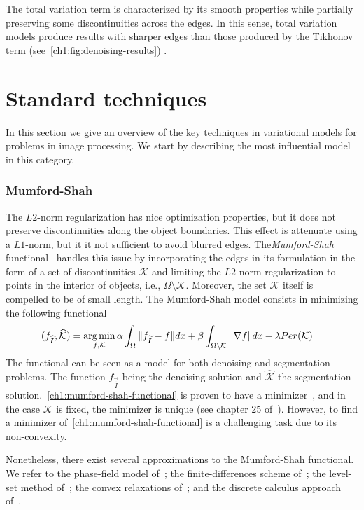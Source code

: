 The total variation term is characterized by its smooth properties while partially preserving some discontinuities across the edges. In this sense, total variation models produce results with sharper edges than those produced by the Tikhonov term (see~\cref{ch1:fig:denoising-results}) .

\section{Standard techniques}

In this section we give an overview of the key techniques in variational models for problems in image processing. We start by describing the most influential model in this category.

\subsubsection{Mumford-Shah}
The $L2$-norm regularization has nice optimization properties, but it does not preserve discontinuities along the object boundaries. This effect is attenuate using a $L1$-norm, but it it not sufficient to avoid blurred edges. The\emph{Mumford-Shah} functional~\cite{mumford89} handles this issue by incorporating the edges in its formulation in the form of a set of discontinuities $\mathcal{K}$ and limiting the $L2$-norm regularization to points in the interior of objects, i.e.,  $\Omega \setminus \mathcal{K}$. Moreover, the set $\mathcal{K}$ itself is compelled to be of small length. The Mumford-Shah model consists in minimizing the following functional 
\begin{align}
	(f_{\bm{\widehat{I}}},\mathcal{\widehat{K}}) &= \operatorname*{arg\,min}_{f,\mathcal{K}} \alpha \int_{\Omega}{ \lVert f_{\bm{\widetilde{I}}}-f\rVert dx} + \beta \int_{\Omega \setminus \mathcal{K}}{\lVert\nabla f\rVert dx} + \lambda Per(\mathcal{K})
	\label{ch1:mumford-shah-functional}
\end{align}
%
The functional can be seen as a model for both denoising and segmentation problems. The function $f_{\vec{\widehat{I}}}$ being the denoising solution and $\mathcal{\widehat{K}}$ the segmentation solution.~\cref{ch1:mumford-shah-functional} is proven to have a minimizer~\cite{degiorgi89}, and in the case $\mathcal{K}$ is fixed, the minimizer is unique (see chapter 25 of~\cite{bar11}). However, to find a minimizer of~\cref{ch1:mumford-shah-functional} is a challenging task due to its non-convexity.

Nonetheless, there exist several approximations to the Mumford-Shah functional. We refer to the phase-field model of~\cite{ambrosio90}; the finite-differences scheme of~\cite{chambolle99}; the level-set method of~\cite{vese02}; the convex relaxations of~\cite{pock09,strekalovskiy14}; and the discrete calculus approach of~\cite{foare17}.

